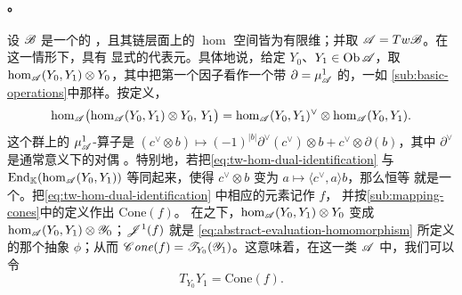 \paragraph{\trTwistedComplex。}\label{sub:twisted-complexes-representatives}
设 $\mathscr{B}$ 是一个\trStrictlyUnital{}的 \trACategory，且其链层面上的 $\hom$
空间皆为有限维；并取 $\mathscr{A}=Tw\mathscr{B}$。在这一情形下，\trTwistFunctor{}具有
显式的代表元。具体地说，给定 $Y_0$、$Y_1\in\operatorname{Ob}\mathscr{A}$，取\trTensorProduct{}%
$\hom_{\mathscr{A}}(Y_0,Y_1)\otimes Y_0$，其中把第一个因子看作一个带%
\trBoundaryOperator{} $\partial=\mu^1_{\mathscr{A}}$ 的\trChainComplex，一如%
\cref{sub:basic-operations}中那样。按定义，
\begin{equation}\label{eq:tw-hom-dual-identification}
\hom_{\mathscr{A}}\bigl(\hom_{\mathscr{A}}(Y_0,Y_1)\otimes Y_0,\,Y_1\bigr)
=\hom_{\mathscr{A}}(Y_0,Y_1)^{\vee}\otimes\hom_{\mathscr{A}}(Y_0,Y_1).
\end{equation}
这个\trMorphism{}群上的 $\mu^1_{\mathscr{A}}$-算子是
$(c^{\vee}\otimes b)\mapsto(-1)^{|b|}\partial^{\vee}(c^{\vee})\otimes b
+c^{\vee}\otimes\partial(b)$，其中 $\partial^{\vee}$ 是通常意义下的对偶%
\trDifferential。特别地，若把\eqref{eq:tw-hom-dual-identification} 与
$\mathrm{End}_{\mathbb{K}}(\hom_{\mathscr{A}}(Y_0,Y_1))$ 等同起来，使得 $c^{\vee}\otimes b$
变为\trEndomorphism{} $a\mapsto\langle c^{\vee},a\rangle b$，那么恒等%
\trEndomorphism{}就是一个\trCocycle。把\eqref{eq:tw-hom-dual-identification}
中相应的元素记作 $f$，
并按\cref{sub:mapping-cones}中的定义作出\trMappingCone{} $\mathrm{Cone}(f)$。
在\trYonedaEmbedding{}之下，$\hom_{\mathscr{A}}(Y_0,Y_1)\otimes Y_0$ 变成
$\hom_{\mathscr{A}}(Y_0,Y_1)\otimes\mathscr{Y}_0$；$\mathscr{J}^1(f)$ 就是
\eqref{eq:abstract-evaluation-homomorphism} 所定义的那个抽象%
\trEvaluationMap{} $\phi$；从而 $\mathscr{C}\mathit{one}(f)=\mathscr{T}_{Y_0}
(\mathscr{Y}_1)$。这意味着，在这一类\trACategory{} $\mathscr{A}$ 中，我们可以令
\begin{equation}\label{eq:twist-cone-representative}
T_{Y_0}Y_1=\mathrm{Cone}(f).
\end{equation}


